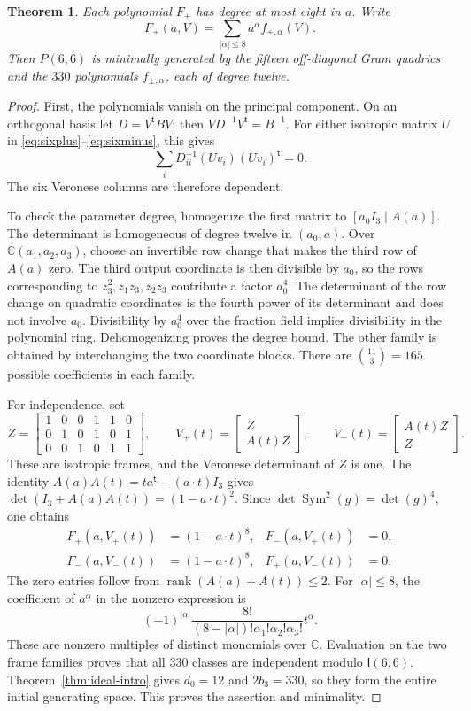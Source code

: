 \documentclass[11pt]{article}
\newtheorem{theorem}{Theorem}[section]
\theoremstyle{definition}
\theoremstyle{remark}
\numberwithin{equation}{section}
\DeclareMathOperator{\rank}{rank}
\DeclareMathOperator{\Sym}{Sym}
\newcommand{\CC}{\mathbb C}
\newcommand{\II}{\mathsf I}
\begin{document}
\begin{theorem}\label{thm:six-explicit}
Each polynomial $F_\pm$ has degree at most eight in $a$. Write
\[
 F_\pm(a,V)=\sum_{|\alpha|\leq8}a^\alpha f_{\pm,\alpha}(V).
\]
Then $P(6,6)$ is minimally generated by the fifteen off-diagonal Gram
quadrics and the $330$ polynomials $f_{\pm,\alpha}$, each of degree twelve.
\end{theorem}

\begin{proof}
First, the polynomials vanish on the principal component. On an
orthogonal basis let $D=V^{\mathsf t}BV$; then
$VD^{-1}V^{\mathsf t}=B^{-1}$. For either isotropic matrix $U$ in
\eqref{eq:sixplus}--\eqref{eq:sixminus}, this gives
\[
 \sum_i D_{ii}^{-1}(Uv_i)(Uv_i)^{\mathsf t}=0.
\]
The six Veronese columns are therefore dependent.

To check the parameter degree, homogenize the first matrix to
$[a_0I_3\mid A(a)]$. The determinant is homogeneous of degree twelve
in $(a_0,a)$. Over $\CC(a_1,a_2,a_3)$, choose an invertible row change
that makes the third row of $A(a)$ zero. The third output coordinate
is then divisible by $a_0$, so the rows corresponding to
$z_3^2,z_1z_3,z_2z_3$ contribute a factor $a_0^4$. The determinant
of the row change on quadratic coordinates is the fourth power of
its determinant and does not involve $a_0$. Divisibility by $a_0^4$
over the fraction field implies divisibility in the polynomial ring.
Dehomogenizing proves the degree bound. The other family is obtained
by interchanging the two coordinate blocks. There are
$\binom{11}{3}=165$ possible coefficients in each family.

For independence, set
\[
 Z=\begin{bmatrix}
 1&0&0&1&1&0\\0&1&0&1&0&1\\0&0&1&0&1&1
 \end{bmatrix},\qquad
 V_+(t)=\begin{bmatrix}Z\\A(t)Z\end{bmatrix},\qquad
 V_-(t)=\begin{bmatrix}A(t)Z\\Z\end{bmatrix}.
\]
These are isotropic frames, and the Veronese determinant of $Z$ is
one. The identity
$A(a)A(t)=ta^{\mathsf t}-(a\cdot t)I_3$ gives
$\det(I_3+A(a)A(t))=(1-a\cdot t)^2$. Since
$\det\Sym^2(g)=\det(g)^4$, one obtains
\begin{align*}
 F_+(a,V_+(t))&=(1-a\cdot t)^8,&F_-(a,V_+(t))&=0,\\
 F_-(a,V_-(t))&=(1-a\cdot t)^8,&F_+(a,V_-(t))&=0.
\end{align*}
The zero entries follow from $\rank(A(a)+A(t))\leq2$.
For $|\alpha|\leq8$, the coefficient of $a^\alpha$ in the nonzero
expression is
\[
 (-1)^{|\alpha|}\frac{8!}{(8-|\alpha|)!\alpha_1!\alpha_2!\alpha_3!}
 t^\alpha.
\]
These are nonzero multiples of distinct monomials over $\CC$.
Evaluation on the two frame families proves that all $330$ classes
are independent modulo $\II(6,6)$. Theorem~\ref{thm:ideal-intro}
gives $d_0=12$ and $2b_3=330$, so they form the entire initial
generating space. This proves the assertion and minimality.
\end{proof}
\end{document}
